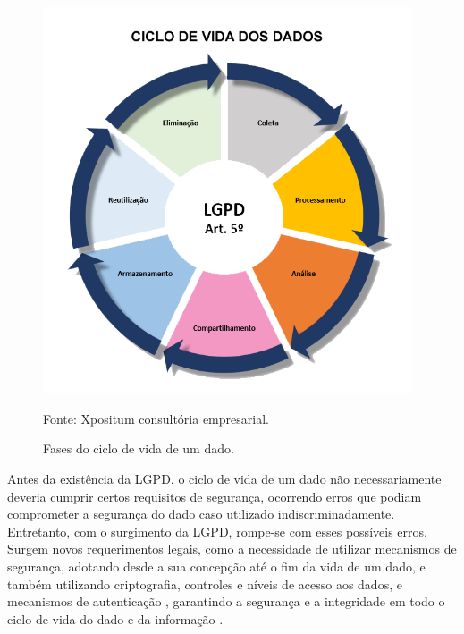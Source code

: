 \documentclass[
	12pt,				%
	openright,			%
	oneside,			%
	a4paper,			%
	english,			%
	french,				%
	spanish,			%
	brazil,				%
	]{abntex2}
\begin{document}
\begin{figure}[ht]
    \centering
    \caption{Fases do ciclo de vida de um dado.}
    \includegraphics[width=4.3in]{Images/01CicloDeVida.png}
    \label{fig: 01CicloDeVida}
    
    \centering \small Fonte: Xpositum consultória empresarial.
\end{figure}

Antes da existência da LGPD, o ciclo de vida de um dado não necessariamente deveria cumprir certos requisitos de segurança, ocorrendo erros que podiam comprometer a segurança do dado caso utilizado indiscriminadamente. Entretanto, com o surgimento da LGPD, rompe-se com esses possíveis erros. Surgem novos requerimentos legais, como a necessidade de utilizar mecanismos de segurança, adotando desde a sua concepção até o fim da vida de um dado, e também utilizando criptografia, controles e níveis de acesso aos dados, e mecanismos de autenticação \cite{Castro2020}, garantindo a segurança e a integridade em todo o ciclo de vida do dado e da informação \cite{Jimene2020}.
\end{document}
